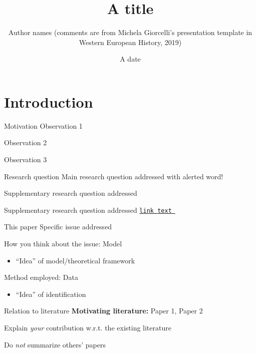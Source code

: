 \documentclass[aspectratio=169, 11pt]{beamer}
\title[Some title]{A title}
\author{Author names (comments are from Michela Giorcelli's presentation template in Western European History, 2019)}
\date{A date}
\begin{document}
\maketitle

{%
\section{Introduction}}

\begin{frame}{Motivation}
    Observation 1
    
    Observation 2
    
    Observation 3
\end{frame}

\begin{frame}{Research question}
    Main research question addressed with \alert{alerted} word!\pause
    
    Supplementary research question addressed\pause
    
    Supplementary research question addressed \hyperlink{app_example}{\texttt{link text}~ }
\end{frame}

\begin{frame}{This paper}
    Specific issue addressed
    
    How you think about the issue: Model\\
    \begin{itemize}
        \item ``Idea'' of model/theoretical framework
    \end{itemize}
    
    Method employed: Data\\
    \begin{itemize}
        \item ``Idea'' of identification
    \end{itemize}
\end{frame}

\begin{frame}{Relation to literature}
    \textbf{Motivating literature:} Paper 1, Paper 2
    
    Explain \emph{your} contribution w.r.t. the existing literature
    
    Do \emph{not} summarize others' papers
\end{frame}
\end{document}
